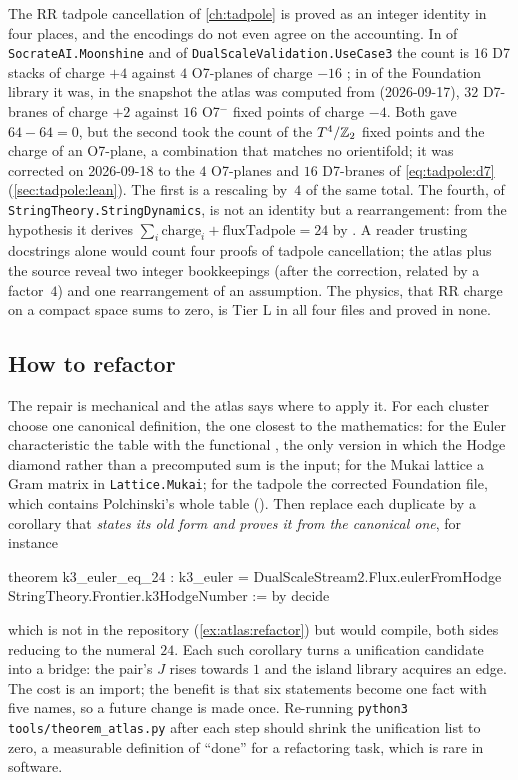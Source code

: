 The RR tadpole cancellation of \cref{ch:tadpole} is proved as an integer identity in four
places, and the encodings do not even agree on the accounting. In
 of \texttt{SocrateAI.Moonshine} and of
\texttt{DualScaleValidation.UseCase3} the count is $16$ D7 stacks of charge $+4$ against
$4$ O7-planes of charge $-16$ ; in
 of the Foundation library it was, in the snapshot the atlas
was computed from (2026-09-17), $32$ D7-branes of charge $+2$ against $16$ O7$^-$ fixed points
of charge $-4$. Both gave $64-64=0$, but the second took the count of the $T^4/\mathbb{Z}_2$ fixed
points and the charge of an O7-plane, a combination that matches no orientifold; it was
corrected on 2026-09-18 to the $4$ O7-planes and $16$ D7-branes of \eqref{eq:tadpole:d7}
(\cref{sec:tadpole:lean}). The first is a rescaling by~$4$ of the same total. The fourth,  of
\texttt{StringTheory.StringDynamics}, is not an identity but a rearrangement: from the
hypothesis  it derives
$\sum_i\text{charge}_i+\text{fluxTadpole}=24$ by 
. A reader trusting docstrings
alone would count four proofs of tadpole cancellation; the atlas plus the source reveal
two integer bookkeepings (after the correction, related by a factor~$4$) and one rearrangement of an assumption. The physics,
that RR charge on a compact space sums to zero, is Tier L in all four files and proved in
none.

\subsection{How to refactor}

The repair is mechanical and the atlas says where to apply it. For each cluster choose
one canonical definition, the one closest to the mathematics: for the Euler characteristic
the table  with the functional , the only version
in which the Hodge diamond rather than a precomputed sum is the input; for the Mukai
lattice a Gram matrix in \texttt{Lattice.Mukai}; for the tadpole the corrected Foundation file,
which contains Polchinski's whole table (). Then replace each duplicate by a corollary that \emph{states its
old form and proves it from the canonical one}, for instance
\begin{leancode}
theorem k3_euler_eq_24 :
    k3_euler = DualScaleStream2.Flux.eulerFromHodge
      StringTheory.Frontier.k3HodgeNumber := by decide
\end{leancode}
which is not in the repository (\cref{ex:atlas:refactor}) but would compile, both sides
reducing to the numeral $24$. Each such corollary turns a unification candidate into a
bridge: the pair's $J$ rises towards $1$ and the island library acquires an edge. The
cost is an import; the benefit is that six statements become one fact with five names, so
a future change is made once. Re-running \texttt{python3 tools/theorem\_atlas.py} after
each step should shrink the unification list to zero, a measurable definition of
``done'' for a refactoring task, which is rare in software.

